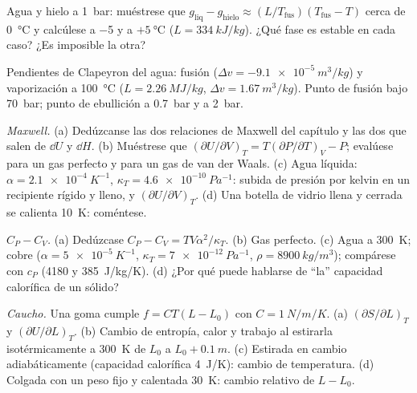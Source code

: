 \begin{exercise}[$\star$]\label{exo:b2:thermodynamic-potentials:3}
Agua y hielo a \qty{1}{bar}: muéstrese que $g_{\text{liq}} - g_{\text{hielo}} \approx
(L/T_{\text{fus}})(T_{\text{fus}} - T)$ cerca de \qty{0}{\celsius} y calcúlese
a \qty{-5}{} y a $+\qty{5}{\celsius}$ ($L = \qty{334}{kJ/kg}$). ¿Qué fase es
estable en cada caso? ¿Es imposible la otra?
\end{exercise}

\begin{exercise}[$\star$]\label{exo:b2:thermodynamic-potentials:4}
Pendientes de Clapeyron del agua: fusión ($\Delta v = -\qty{9.1e-5}{m^3/kg}$) y
vaporización a \qty{100}{\celsius} ($L = \qty{2.26}{MJ/kg}$, $\Delta v =
\qty{1.67}{m^3/kg}$). Punto de fusión bajo \qty{70}{bar}; punto de ebullición a
\qty{0.7}{bar} y a \qty{2}{bar}.
\end{exercise}

\begin{exercise}[$\star\star$]\label{exo:b2:thermodynamic-potentials:5}
\emph{Maxwell.} (a) Dedúzcanse las dos relaciones de Maxwell del capítulo
y las dos que salen de $\dd U$ y $\dd H$. (b) Muéstrese que $(\partial U/\partial V)_T =
T(\partial P/\partial T)_V - P$; evalúese para un gas perfecto y para un gas de van
der Waals. (c) Agua líquida: $\alpha = \qty{2.1e-4}{K^{-1}}$, $\kappa_T =
\qty{4.6e-10}{Pa^{-1}}$: subida de presión por kelvin en un recipiente rígido y lleno,
y $(\partial U/\partial V)_T$. (d) Una botella de vidrio llena y cerrada se calienta
\qty{10}{K}: coméntese.
\end{exercise}

\begin{exercise}[$\star\star$]\label{exo:b2:thermodynamic-potentials:6}
\emph{$C_P - C_V$.} (a) Dedúzcase $C_P - C_V = TV\alpha^2/\kappa_T$. (b)
Gas perfecto. (c) Agua a \qty{300}{K}; cobre ($\alpha = \qty{5e-5}{K^{-1}}$,
$\kappa_T = \qty{7e-12}{Pa^{-1}}$, $\rho = \qty{8900}{kg/m^3}$); compárese con
$c_P$ (\qty{4180}{} y \qty{385}{J/kg/K}). (d) ¿Por qué puede hablarse de
``la'' capacidad calorífica de un sólido?
\end{exercise}

\begin{exercise}[$\star\star$]\label{exo:b2:thermodynamic-potentials:7}
\emph{Caucho.} Una goma cumple $f = CT(L - L_0)$ con $C = \qty{1}{N/m/K}$.
(a) $(\partial S/\partial L)_T$ y $(\partial U/\partial L)_T$. (b) Cambio de
entropía, calor y trabajo al estirarla isotérmicamente a \qty{300}{K} de
$L_0$ a $L_0 + \qty{0.1}{m}$. (c) Estirada en cambio adiabáticamente (capacidad
calorífica \qty{4}{J/K}): cambio de temperatura. (d) Colgada con un peso fijo
y calentada \qty{30}{K}: cambio relativo de $L - L_0$.
\end{exercise}

